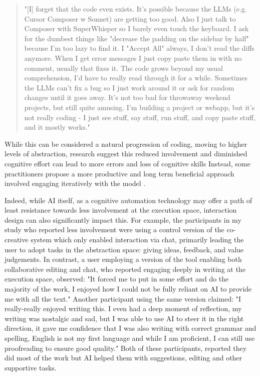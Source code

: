 \begin{quote}
"[I] forget that the code even exists. It's possible because the LLMs (e.g. Cursor Composer w Sonnet) are getting too good. Also I just talk to Composer with SuperWhisper so I barely even touch the keyboard. I ask for the dumbest things like "decrease the padding on the sidebar by half" because I'm too lazy to find it. I "Accept All" always, I don't read the diffs anymore. When I get error messages I just copy paste them in with no comment, usually that fixes it. The code grows beyond my usual comprehension, I'd have to really read through it for a while. Sometimes the LLMs can't fix a bug so I just work around it or ask for random changes until it goes away. It's not too bad for throwaway weekend projects, but still quite amusing. I'm building a project or webapp, but it's not really coding - I just see stuff, say stuff, run stuff, and copy paste stuff, and it mostly works."
\end{quote}

While this can be considered a natural progression of coding, moving to higher levels of abstraction, research suggest this reduced involvement and diminished cognitive effort can lead to more errors and loss of cognitive skills \cite{Lee2025-dwL} Instead, some practitioners propose a more productive and long term beneficial approach involved engaging iteratively with the model \cite{Osmani2024-br}. 

Indeed, while AI itself, as a cognitive automation technology may offer a path of least resistance towards less involvement at the execution space, interaction design can also significantly impact this. For example, the participants in my study who reported less involvement were using a control version of the co-creative system which only enabled interaction via chat, primarily leading the user to adopt tasks in the abstraction space: giving ideas, feedback, and value judgements. In contrast, a user employing a version of the tool enabling both collaborative editing and chat, who reported engaging deeply in writing at the execution space, observed: "It forced me to put in some effort and do the majority of the work, I enjoyed how I could not be fully reliant on AI to provide me with all the text." Another participant using the same version claimed: "I really-really enjoyed writing this. I even had a deep moment of reflection, my writing was nostalgic and sad, but I was able to use AI to steer it in the right direction, it gave me confidence that I was also writing with correct grammar and spelling, English is not my first language and while I am proficient, I can still use proofreading to ensure good quality." Both of these participants, reported they did most of the work but AI helped them with suggestions, editing and other supportive tasks. 

